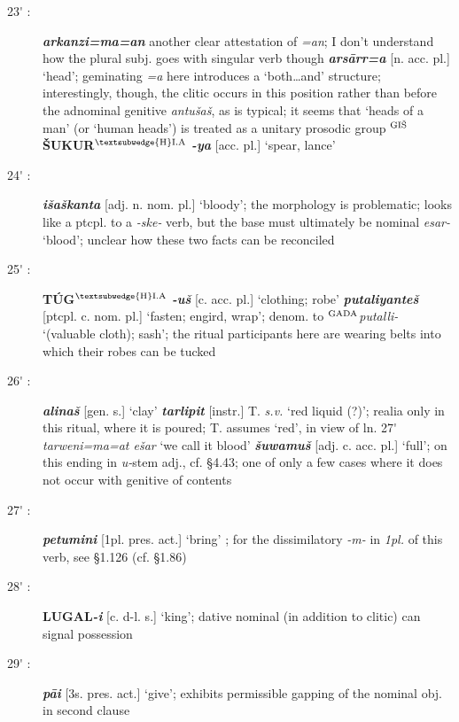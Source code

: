 \documentclass[10pt]{article}
\newcommand{\supersc}[1]{$^{\textrm{\scriptsize{#1}}}$}  	%
\newcommand{\bit}[1]{\textbf{\textit{#1}}}				%
\newcommand{\p}[1]{{\tiny[{#1}]}}					%
\newcommand{\pr}{\'{ }}									%
\newcommand{\hith}{\textsubwedge{h}}
\newcommand{\Hith}{\textsubwedge{H}}
\newcommand{\hpl}{\supersc{{\Hith}I.A}}
\newcommand{\wood}{\supersc{GI\v{S}}}
\renewcommand{\.}[1]{\textsubdot{#1}}
\begin{document}
\begin{description}
\item[23{\pr} :] \bit{{\hith}arkanzi=ma=an} another clear attestation of \textit{=an}; I don't understand how the plural subj. goes with singular verb though \bit{{\hith}ars\=arr=a} \p{n. acc. pl.} `head'; geminating \textit{=a} here introduces a `both{\ldots}and' structure; interestingly, though, the clitic occurs in this position rather than before the adnominal genitive \textit{antu{\hith}\v{s}a\v{s}}, as is typical; it seems that `heads of a man' (or `human heads') is treated as a unitary prosodic group  \textbf{{\wood}\v{S}UKUR{\hpl}}\bit{ -ya} \p{acc. pl.} `spear, lance'

\item[24{\pr} :] \bit{i\v{s}{\hith}a\v{s}kanta} \p{adj. n. nom. pl.} `bloody'; the morphology is problematic; looks like a ptcpl. to a \textit{-ske-} verb, but the base must ultimately be nominal \textit{es{\hith}ar-} `blood'; unclear how these two facts can be reconciled

\item[25{\pr} :] \textbf{T\'UG{\hpl}}\bit{ -u\v{s}} \p{c. acc. pl.} `clothing; robe' \bit{putaliyante\v{s}} \p{ptcpl. c. nom. pl.} `fasten; engird, wrap'; denom. to \supersc{GADA}\textit{putalli-} `(valuable cloth); sash'; the ritual participants here are wearing belts into which their robes can be tucked

\item[26{\pr} :] \bit{{\hith}alina\v{s}} \p{gen. s.} `clay' \bit{tarlipit} \p{instr.} T. \textit{s.v.} `red liquid (?)'; realia only in this ritual, where it is poured; T. assumes `red', in view of ln. 27{\pr} \textit{tarweni=ma=at e\v{s}{\hith}ar} `we call it blood' \bit{\v{s}uwamu\v{s}} \p{adj. c. acc. pl.} `full'; on this ending in \textit{u-}stem adj., cf.  \S4.43; one of only a few cases where it does not occur with genitive of contents

\item[27{\pr} :] \bit{petumini} \p{1pl. pres. act.} `bring' ; for the dissimilatory \textit{-m-} in \textit{1pl.} of this verb, see  \S1.126 (cf. \S1.86)

\item[28{\pr} :] \textbf{LUGAL}\bit{-i} \p{c. d-l. s.} `king'; dative nominal (in addition to clitic) can signal possession

\item[29{\pr} :] \bit{p\=ai} \p{3s. pres. act.} `give'; exhibits permissible gapping of the nominal obj. in second clause


\end{description}
\end{document}
